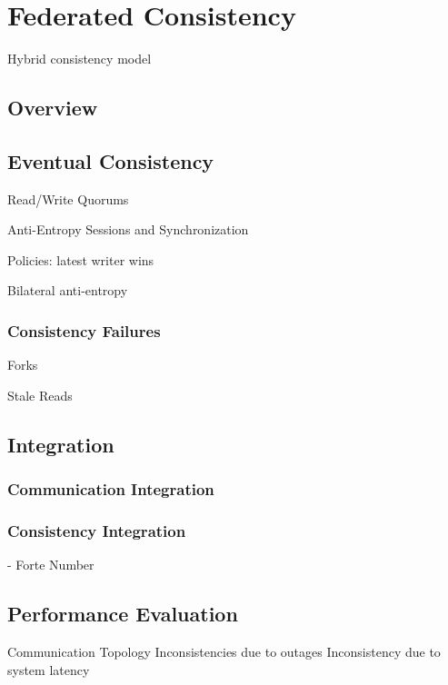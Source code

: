 
\renewcommand{\thechapter}{4}

\chapter{Federated Consistency}

Hybrid consistency model

\section{Overview}

\section{Eventual Consistency}

Read/Write Quorums

Anti-Entropy Sessions and Synchronization

Policies: latest writer wins

Bilateral anti-entropy

\subsection{Consistency Failures}

Forks

Stale Reads

\section{Integration}

\subsection{Communication Integration}

\subsection{Consistency Integration}

- Forte Number

\section{Performance Evaluation}

Communication Topology
Inconsistencies due to outages
Inconsistency due to system latency
